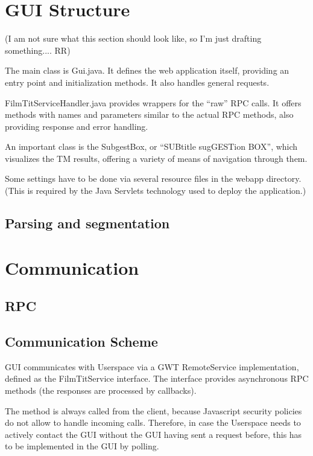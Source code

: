 \section{GUI Structure}

(I am not sure what this section should look like, so I'm just drafting something.... RR)

The main class is Gui.java. It defines the web application itself, providing an entry point and initialization methods. It also handles general requests.

FilmTitServiceHandler.java provides wrappers for the ``raw'' RPC calls. It offers methods with names and parameters similar to the actual RPC methods, also providing response and error handling.

An important class is the SubgestBox, or ``SUBtitle sugGESTion BOX'', which visualizes the TM results, offering a variety of means of navigation through them.

Some settings have to be done via several resource files in the webapp directory. (This is required by the Java Servlets technology used to deploy the application.)

\subsection{Parsing and segmentation}


\section{Communication}
\label{sec:communication}
\subsection{RPC}

\subsection{Communication Scheme}
GUI communicates with Userspace via a GWT RemoteService implementation, defined as the FilmTitService interface.
The interface provides asynchronous RPC methods (the responses are processed by callbacks).

The method is always called from the client, because Javascript security policies do not allow to handle incoming calls.
Therefore, in case the Userspace needs to actively contact the GUI without the GUI having sent a request before,
this has to be implemented in the GUI by polling.

